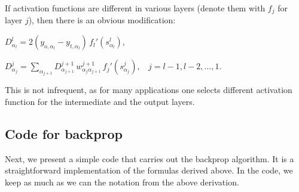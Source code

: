 \documentclass[a4paper,12pt,polish]{jupyterBook}
\begin{document}
\sphinxAtStartPar
If activation functions are different in various layers (denote them with \(f_j\) for layer \(j\)), then there is an obvious modification:

\sphinxAtStartPar
\(D_{\alpha_l}^{l}=2 (y_{o,\alpha_l}-y_{t,\alpha_l})\, f_l'(s_{\alpha_l}^{l})\),

\sphinxAtStartPar
\(D_{\alpha_j}^{j}= \sum_{\alpha_{j+1}} D_{\alpha_{j+1}}^{j+1}\, w_{\alpha_j \alpha_{j+1}}^{j+1} \, f_j'(s_{\alpha_j}^{j}), ~~~~ j=l-1,l-2,\dots,1\).

\sphinxAtStartPar
This is not infrequent, as for many applications one selects different activation function for the intermediate and the output layers.


\subsection{Code for backprop}
\label{\detokenize{docs/backprop:code-for-backprop}}
\sphinxAtStartPar
Next, we present a simple code that carries out the backprop algorithm. It is a straightforward implementation of the formulas derived above. In the code, we keep as much as we can the notation from the above derivation.
\end{document}
